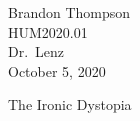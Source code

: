 \noindent
Brandon Thompson \\
HUM2020.01 \\
Dr.\ Lenz \\
October 5, 2020 \\

\begin{center}
The Ironic Dystopia
\end{center}
